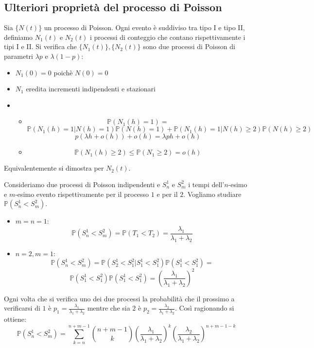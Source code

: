 \subsection{Ulteriori proprietà del processo di Poisson}
Sia $\{N(t)\}$ un processo di Poisson. Ogni evento è suddiviso tra tipo I e tipo II, definiamo $N_1(t)$ e $N_2(t)$ i processi di conteggio che contano rispettivamente i tipi I e II. Si verifica che $\{N_1(t)\},\{N_2(t)\}$ sono due processi di Poisson di parametri $\lambda p$ e $\lambda(1-p)$:
\begin{itemize}
    \item $N_1(0)=0$ poichè $N(0)=0$ 
    \item $N_1$ eredita incrementi indipendenti e stazionari
    \item \begin{itemize}
        \item \[\mathbb{P}(N_1(h)=1)=\]
        \[\mathbb{P}(N_1(h)=1|N(h)=1)\mathbb{P}(N(h)=1)+\mathbb{P}(N_1(h)=1|N(h)\geq2)\mathbb{P}(N(h)\geq2)\]
        \[p(\lambda h+o(h))+o(h)=\lambda ph+o(h)\]
        \item 
        \[\mathbb{P}(N_1(h)\geq2)\leq\mathbb{P}(N_1\geq2)=o(h)\]
    \end{itemize}
\end{itemize}
Equivalentemente si dimostra per $N_2(t)$.\vspace{10px}

Consideriamo due processi di Poisson indipendenti e $S_n^1$ e $S_m^2$ i tempi dell'$n$-esimo e $m$-esimo evento rispettivamente per il processo $1$ e per il $2$. Vogliamo studiare $\mathbb{P}(S_n^1<S_m^2)$.
\begin{itemize}
    \item $m=n=1$: \[\mathbb{P}(S_n^1<S_m^2)=\mathbb{P}(T_1<T_2)=\frac{\lambda_1}{\lambda_1+\lambda_2}\]
    \item $n=2,m=1$: \[\mathbb{P}(S_n^1<S_m^2)=\mathbb{P}(S_2^1<S_1^2|S_1^1<S_1^2)\mathbb{P}(S_1^1<S_1^2)=\]
    \[\mathbb{P}(S_1^1<S_1^2)\mathbb{P}(S_1^1<S_1^2)=\left(\frac{\lambda_1}{\lambda_1+\lambda_2}\right)^2\]
\end{itemize}
Ogni volta che si verifica uno dei due processi la probabilità che il prossimo a verificarsi di $1$ è $p_1=\frac{\lambda_1}{\lambda_1+\lambda_2}$ mentre che sia $2$ è $p_2=\frac{\lambda_2}{\lambda_1+\lambda_2}$. Così ragionando si ottiene:
\[\mathbb{P}(S_n^1<S_m^2)=\sum_{k=n}^{n+m-1}\binom{n+m-1}{k}\left(\frac{\lambda_1}{\lambda_1+\lambda_2}\right)^k\left(\frac{\lambda_2}{\lambda_1+\lambda_2}\right)^{n+m-1-k}\]

